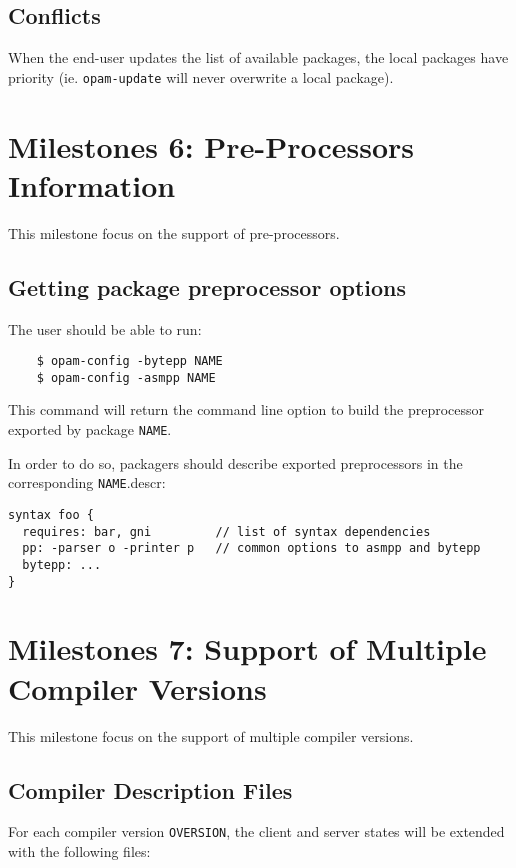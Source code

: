 \documentclass[a4paper,11pt]{article}
\begin{document}
\subsection{Conflicts}

When the end-user updates the list of available packages, the local
packages have priority (ie. {\tt opam-update} will never overwrite a
local package).

\section{Milestones 6: Pre-Processors Information}

This milestone focus on the support of pre-processors.

\subsection{Getting package preprocessor options}

The user should be able to run:

\begin{verbatim}
    $ opam-config -bytepp NAME
    $ opam-config -asmpp NAME
\end{verbatim}

This command will return the command line option to build the
preprocessor exported by package {\tt NAME}.

In order to do so, packagers should describe exported preprocessors in
the corresponding {\tt NAME}.descr:

\begin{verbatim}
syntax foo {
  requires: bar, gni         // list of syntax dependencies
  pp: -parser o -printer p   // common options to asmpp and bytepp
  bytepp: ...
}
\end{verbatim}

\section{Milestones 7: Support of Multiple Compiler Versions}

This milestone focus on the support of multiple compiler versions.

\subsection{Compiler Description Files}

For each compiler version {\tt OVERSION}, the client and server states
will be extended with the following files:
\end{document}
